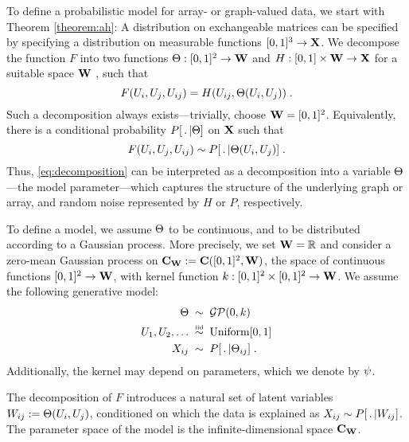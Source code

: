 To define a probabilistic model for array- or graph-valued data, we start with Theorem \ref{theorem:ah}: A distribution on exchangeable matrices
can be specified by specifying a distribution on measurable functions $[0,1]^3\rightarrow\mathbf{X}$. 
We decompose the function $F$ into two functions 
${\Theta:[0,1]^2\rightarrow\mathbf{W}}$ 
and ${H:[0,1]\times\mathbf{W}\rightarrow\mathbf{X}}$ for a suitable space $\mathbf{W}$ , such that
\begin{equation}
  \label{eq:decomposition}
  F(U_i,U_j,U_{ij})=H(U_{ij},\Theta(U_i,U_j))\;.
\end{equation}
Such a decomposition always exists---trivially, choose $\mathbf{W}=[0,1]^2$.
Equivalently, there is a conditional probability $P[\,.\,|\Theta]$ on $\mathbf{X}$ such that
\begin{equation}
  \label{eq:decomposition:sampling}
  F(U_i,U_j,U_{ij})\sim P[\,.\,|\Theta(U_i,U_j)]\;.
\end{equation}
Thus, \eqref{eq:decomposition} can be interpreted as a decomposition into a variable $\Theta$---the model parameter---which captures the structure of the underlying graph or array,
and random noise represented by $H$ or $P$, respectively.

To define a model, we assume $\Theta$ to be continuous, and to be distributed according to a Gaussian process. More precisely,
we set ${\mathbf{W} = \mathbb{R}}$ and consider a zero-mean Gaussian process on 
$\mathbf{C}_{\mathbf{W}}:=\mathbf{C}([0,1]^2,\mathbf{W})$, the space of continuous functions $[0,1]^2\rightarrow\mathbf{W}$,
with kernel function 
${k:[0,1]^2\times[0,1]^2\rightarrow\mathbf{W}}$.
We assume the following generative model:
\begin{equation}
  \label{eq:model}
  \begin{split}
    \Theta\; &\sim\; \mathcal{GP}(0,k) \\
    U_{1},U_{2},\ldots\; &\overset{\mbox{\tiny iid}}{\sim}\; \mbox{\rm Uniform}[0,1] \\
    X_{ij}\; &\sim\; P[\,.\,|\Theta_{ij}] \;.
  \end{split}
\end{equation}
Additionally, the kernel may depend on parameters, which we denote by $\psi$.

The decomposition of $F$ introduces a natural set of latent variables $W_{ij}:=\Theta(U_i,U_j)$, conditioned on which the data is explained as $X_{ij}\sim P[\,.\,|W_{ij}]$. 
The parameter space of the model is the infinite-dimensional space $\mathbf{C}_{\mathbf{W}}$.

